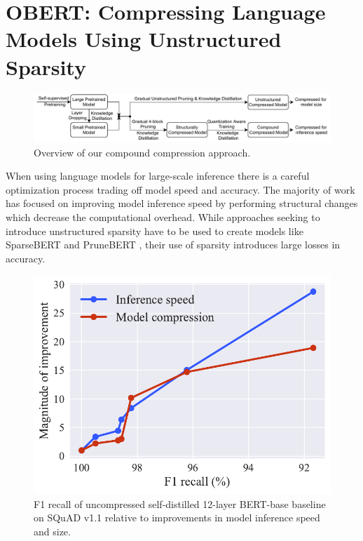 \section{OBERT: Compressing Language Models Using Unstructured Sparsity}
\begin{figure}[!htb]
    \includegraphics[scale=0.8]{media/compound-compression.pdf}
    \centering
    \caption{Overview of our compound compression approach.}
    \label{fig:compoundingsparse}
    \vspace{-1.2em}
\end{figure}
When using language models for large-scale inference there is a careful optimization process trading off model speed and accuracy. The majority of work has focused on improving model inference speed by performing structural changes which decrease the computational overhead. While approaches seeking to introduce unstructured sparsity have to be used to create models like SparseBERT \cite{Shi2021SparseBERTRT} and PruneBERT \cite{Sanh2020MovementPA}, their use of sparsity introduces large losses in accuracy. \\
\begin{figure}[!htb]
    \centering
    \includegraphics[scale=0.7]{media/inf_vs_comp.pdf}
    \vspace{-1em}
    \caption{F1 recall of uncompressed self-distilled 12-layer BERT-base baseline on SQuAD v1.1 relative to improvements in model inference speed and size.}
    \label{fig:inference}
\end{figure}
